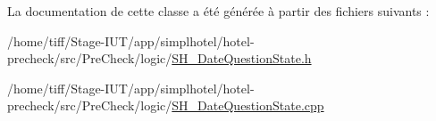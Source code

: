 La documentation de cette classe a été générée à partir des fichiers suivants \-:\begin{DoxyCompactItemize}
\item 
/home/tiff/\-Stage-\/\-I\-U\-T/app/simplhotel/hotel-\/precheck/src/\-Pre\-Check/logic/\hyperlink{SH__DateQuestionState_8h}{S\-H\-\_\-\-Date\-Question\-State.\-h}\item 
/home/tiff/\-Stage-\/\-I\-U\-T/app/simplhotel/hotel-\/precheck/src/\-Pre\-Check/logic/\hyperlink{SH__DateQuestionState_8cpp}{S\-H\-\_\-\-Date\-Question\-State.\-cpp}\end{DoxyCompactItemize}
